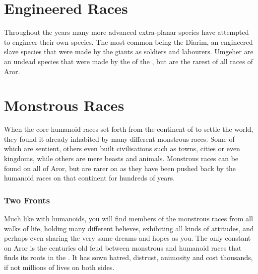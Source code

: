 





\section{Engineered Races}
\label{sec:Engineered Races}

Throughout the years many more advanced extra-planar species have attempted to
engineer their own species. The most common being the Diarim, an engineered
slave species that were made by the giants as soldiers and labourers. Umgeher
are an undead species that were made by the  of the
, but are the rarest of all races of Aror.





\section{Monstrous Races}
\label{sec:Monstrous Races}


When the core humanoid races set forth from the continent
of  to settle the world, they found it already inhabited
by many different monstrous races. Some of which are sentient, others even
built civilisations such as towns, cities or even kingdoms, while others are
mere beasts and animals. Monstrous races can be found on all of Aror, but are
rarer on  as they have been pushed back by the
humanoid races on that continent for hundreds of years.

\subsubsection{Two Fronts}

Much like with humanoids, you will find members of the monstrous races from
all walks of life, holding many different believes, exhibiting all kinds of
attitudes, and perhaps even sharing the very same dreams and hopes as you. The
only constant on Aror is the centuries old feud between monstrous and humanoid
races that finds its roots in the . It has sown hatred,
distrust, animosity and cost thousands, if not millions of lives on both
sides.

